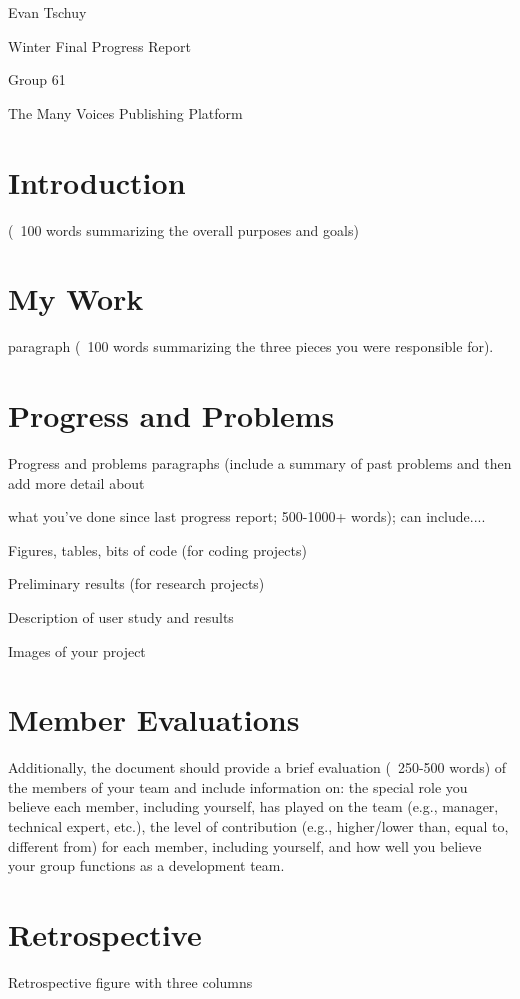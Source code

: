 \documentclass[onecolumn, draftclsnofoot,10pt, compsoc]{IEEEtran}
\begin{document}
\noindent Evan Tschuy

\noindent Winter Final Progress Report

\noindent Group 61

\noindent The Many Voices Publishing Platform


\section{Introduction}
\noindent (~100 words summarizing the overall purposes and goals) \\

\section{My Work}
\noindent paragraph (~100 words summarizing the three pieces you were responsible for). \\

\section{Progress and Problems}
Progress and problems paragraphs (include a summary of past problems and then add more detail about

what you’ve done since last progress report; 500-1000+ words); can include....

 Figures, tables, bits of code (for coding projects)

 Preliminary results (for research projects)

 Description of user study and results

 Images of your project

\section{Member Evaluations}
Additionally, the document should provide a brief evaluation (~250-500 words) of the members of your team and include information on:
the special role you believe each member, including yourself, has played on the team (e.g., manager, technical expert, etc.),
the level of contribution (e.g., higher/lower than, equal to, different from) for each member, including yourself, and
how well you believe your group functions as a development team.

\section{Retrospective}
Retrospective figure with three columns
\end{document}
